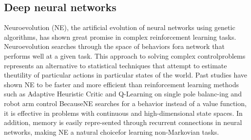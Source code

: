\subsection{Deep neural networks}
Neuroevolution (NE), the artificial evolution of neural networks using genetic algorithms, 
has shown great promise in complex reinforcement learning tasks. 
Neuroevolution searches through the space of behaviors fora network that performs well
at a given task.
This approach to solving complex controlproblems represents an alternative to statistical
techniques that attempt to estimate theutility of particular actions in particular states
of the world.
Past studies have shown NE to be faster and more efficient than reinforcement learning methods
such as Adaptive Heuristic Critic and Q-Learning on single pole balanc-ing and robot arm control
BecauseNE searches for a behavior instead of a value function, it is effective in problems with
continuous and high-dimensional state spaces.
In addition,  memory is easily repre-sented through recurrent connections in neural networks,
making NE a natural choicefor learning non-Markovian tasks.

